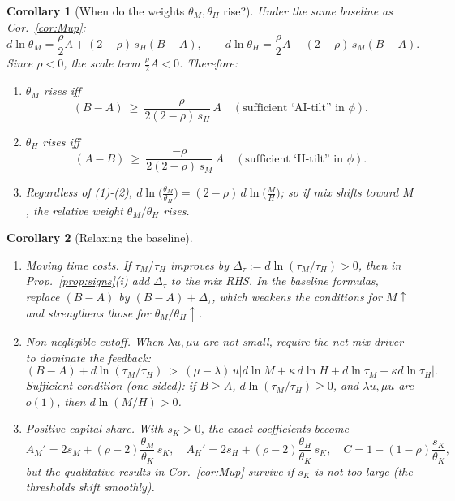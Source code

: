 \documentclass[english]{article}
\newtheorem{corollary}{Corollary}
\begin{document}
\begin{corollary}[When do the weights $\theta_M,\theta_H$ rise?]\label{cor:weights}
Under the same baseline as Cor.~\ref{cor:Mup}:
\[
d\ln\theta_M=\frac{\rho}{2}A+(2-\rho)\,s_H(B-A),\qquad
d\ln\theta_H=\frac{\rho}{2}A-(2-\rho)\,s_M(B-A).
\]
Since $\rho<0$, the scale term $\frac{\rho}{2}A<0$. Therefore:
\begin{enumerate}
\item $\theta_M$ rises iff 
\[
( B-A )\ \ge\ \frac{-\rho}{2(2-\rho)\,s_H}\,A\quad(\text{sufficient `AI-tilt'' in }\phi).
\]
\item $\theta_H$ rises iff 
\[
( A-B )\ \ge\ \frac{-\rho}{2(2-\rho)\,s_M}\,A\quad(\text{sufficient `H-tilt'' in }\phi).
\]
\item Regardless of (1)-(2), $\displaystyle d\ln\!\Big(\frac{\theta_M}{\theta_H}\Big)=(2-\rho)\,d\ln\!\Big(\frac{M}{H}\Big)$; so if mix shifts toward $M$, the relative weight $\theta_M/\theta_H$ rises.
\end{enumerate}
\end{corollary}

\begin{corollary}[Relaxing the baseline]\label{cor:relax}
\leavevmode
\begin{enumerate}
\item \emph{Moving time costs.} If $\tau_M/\tau_H$ improves by $\Delta_\tau:=d\ln(\tau_M/\tau_H)>0$, then in Prop.~\ref{prop:signs}(i) add $\Delta_\tau$ to the mix RHS. In the baseline formulas, replace $(B-A)$ by $(B-A)+\Delta_\tau$, which \emph{weakens} the conditions for $M\uparrow$ and \emph{strengthens} those for $\theta_M/\theta_H\uparrow$.
\item \emph{Non-negligible cutoff.} When $\lambda u,\mu u$ are not small, require the net mix driver to dominate the feedback:
\[
(B-A)+d\ln(\tau_M/\tau_H)\ >\ (\mu-\lambda)\,u\Big|d\ln M+\kappa\,d\ln H+d\ln\tau_M+\kappa d\ln\tau_H\Big|.
\]
Sufficient condition (one-sided): if $B\ge A$, $d\ln(\tau_M/\tau_H)\ge0$, and $\lambda u,\mu u$ are $o(1)$, then $d\ln(M/H)>0$.
\item \emph{Positive capital share.} With $s_K>0$, the exact coefficients become
\[
A_M'=2s_M+(\rho-2)\frac{\theta_M}{\theta_K}\,s_K,\quad
A_H'=2s_H+(\rho-2)\frac{\theta_H}{\theta_K}\,s_K,\quad
C=1-(1-\rho)\frac{s_K}{\theta_K},
\]
but the qualitative results in Cor.~\ref{cor:Mup} survive if $s_K$ is not too large (the thresholds shift smoothly).
\end{enumerate}
\end{corollary}
\end{document}
